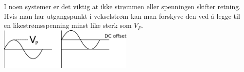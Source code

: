 I noen systemer er det viktig at ikke strømmen
eller spenningen skifter retning.
Hvis man har utgangspunkt i vekselstrøm kan man forskyve den
ved å legge til en likestrømsspenning minst like sterk
som $V_{P}$.
\\
\includegraphics[width=0.5\textwidth]{./img/dcoffset}
